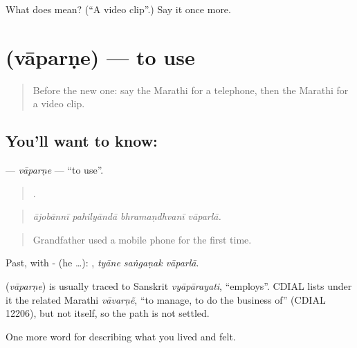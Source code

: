 \begin{tcolorbox}[breakable,colback=teal!4,colframe=teal!35!black,title={Before you move on}]
What does  mean? (\textquotedblleft{}A video clip\textquotedblright{}.) Say it once more.
\end{tcolorbox}
\section[\texorpdfstring{\mr{वापरणे} (vāparṇe)}{वापरणे (vāparṇe)}]{ (vāparṇe) — to use}

\label{lesson:MR-C516-vaparne}



\begin{quote}
Before the new one: say the Marathi for a telephone, then the Marathi for a video clip.
\end{quote}

\subsection*{You'll want to know: }
\textbf{} — \emph{vāparṇe} — \textquotedblleft{}to use\textquotedblright{}.

\begin{quote}
   .
\end{quote}

\begin{quote}
\emph{ājobānnī pahilyāndā bhramaṇdhvanī vāparlā.}
\end{quote}

\begin{quote}
Grandfather used a mobile phone for the first time.
\end{quote}

Past, with - (he …):   , \emph{tyāne saṅgaṇak vāparlā}.

\begin{cousinweb}
\textbf{} (\emph{vāparṇe}) is usually traced to Sanskrit \emph{vyāpārayati}, \textquotedblleft{}employs\textquotedblright{}. CDIAL lists under it the related Marathi \emph{vāvarṇẽ}, \textquotedblleft{}to manage, to do the business of\textquotedblright{} (CDIAL 12206), but not  itself, so the path is not settled.
\end{cousinweb}

\begin{grammarlens}[title={What you've built}]
One more word for describing what you lived and felt.
\end{grammarlens}

